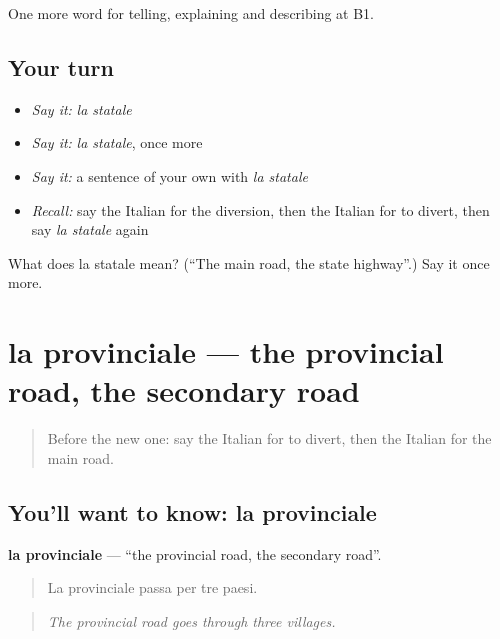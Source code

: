 \begin{grammarlens}[title={What you've built}]
One more word for telling, explaining and describing at B1.
\end{grammarlens}

\subsection*{Your turn}
\begin{itemize}
\raggedright
  \item \emph{Say it:} \emph{la statale}
  \item \emph{Say it:} \emph{la statale}, once more
  \item \emph{Say it:} a sentence of your own with \emph{la statale}
  \item \emph{Recall:} say the Italian for the diversion, then the Italian for to divert, then say \emph{la statale} again
\end{itemize}

\begin{tcolorbox}[breakable,colback=teal!4,colframe=teal!35!black,title={Before you move on}]
What does la statale mean? (\textquotedblleft{}The main road, the state highway\textquotedblright{}.) Say it once more.
\end{tcolorbox}
\section[la provinciale]{la provinciale — the provincial road, the secondary road}

\label{lesson:IT-C414-provinciale}



\begin{quote}
Before the new one: say the Italian for to divert, then the Italian for the main road.
\end{quote}

\subsection*{You'll want to know: la provinciale}
\textbf{la provinciale} — \textquotedblleft{}the provincial road, the secondary road\textquotedblright{}.

\begin{quote}
La provinciale passa per tre paesi.
\end{quote}

\begin{quote}
\emph{The provincial road goes through three villages.}
\end{quote}

